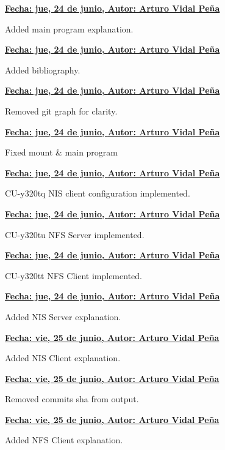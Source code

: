 \item \textbf{\underline{\underline{Fecha:} jue, 24 de junio, \underline{Autor:} Arturo Vidal Peña}}\\\item[] Added main program explanation.\\
\item \textbf{\underline{\underline{Fecha:} jue, 24 de junio, \underline{Autor:} Arturo Vidal Peña}}\\\item[] Added bibliography.\\
\item \textbf{\underline{\underline{Fecha:} jue, 24 de junio, \underline{Autor:} Arturo Vidal Peña}}\\\item[] Removed git graph for clarity.\\
\item \textbf{\underline{\underline{Fecha:} jue, 24 de junio, \underline{Autor:} Arturo Vidal Peña}}\\\item[] Fixed mount \& main program\\
\item \textbf{\underline{\underline{Fecha:} jue, 24 de junio, \underline{Autor:} Arturo Vidal Peña}}\\\item[] CU-y320tq NIS client configuration implemented.\\
\item \textbf{\underline{\underline{Fecha:} jue, 24 de junio, \underline{Autor:} Arturo Vidal Peña}}\\\item[] CU-y320tu NFS Server implemented.\\
\item \textbf{\underline{\underline{Fecha:} jue, 24 de junio, \underline{Autor:} Arturo Vidal Peña}}\\\item[] CU-y320tt NFS Client implemented.\\
\item \textbf{\underline{\underline{Fecha:} jue, 24 de junio, \underline{Autor:} Arturo Vidal Peña}}\\\item[] Added NIS Server explanation.\\
\item \textbf{\underline{\underline{Fecha:} vie, 25 de junio, \underline{Autor:} Arturo Vidal Peña}}\\\item[] Added NIS Client explanation.\\
\item \textbf{\underline{\underline{Fecha:} vie, 25 de junio, \underline{Autor:} Arturo Vidal Peña}}\\\item[] Removed commits sha from output.\\
\item \textbf{\underline{\underline{Fecha:} vie, 25 de junio, \underline{Autor:} Arturo Vidal Peña}}\\\item[] Added NFS Client explanation.\\